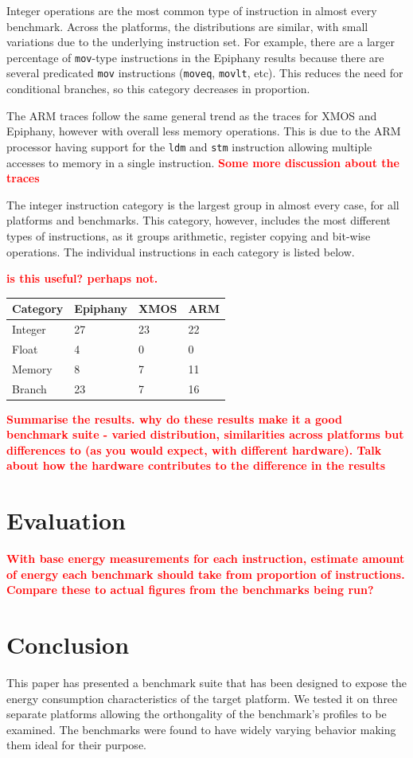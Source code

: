 \documentclass[twocolumn]{article}
\newcommand{\nsection}[1]{\section{\bfseries #1}}
\newcommand{\todo}[1]{\textbf{\textcolor{red}{#1}}}
\begin{document}
Integer operations are the most common type of instruction in almost every benchmark. Across the platforms, the distributions are similar, with small variations due to the underlying instruction set. For example, there are a larger percentage of \texttt{mov}-type instructions in the Epiphany results because there are several predicated \texttt{mov} instructions (\texttt{moveq}, \texttt{movlt}, etc). This reduces the need for conditional branches, so this category decreases in proportion.

The ARM traces follow the same general trend as the traces for XMOS and Epiphany, however with overall less memory operations. This is due to the ARM processor having support for the \texttt{ldm} and \texttt{stm} instruction allowing multiple accesses to memory in a single instruction.
\todo{Some more discussion about the traces}

The integer instruction category is the largest group in almost every case, for all platforms and benchmarks. This category, however, includes the most different types of instructions, as it groups arithmetic, register copying and bit-wise operations. The individual instructions in each category is listed below.

\todo{is this useful? perhaps not.}

\begin{center}
	\begin{tabular}{l l l l}
		Category 	& Epiphany  & XMOS 	& ARM \\
		\hline
		Integer	 	& 27	  	& 23	& 22  \\
		Float		& 4			& 0		& 0	  \\
		Memory		& 8			& 7		& 11  \\
		Branch		& 23		& 7		& 16  \\
	\end{tabular}
\end{center}

\todo{Summarise the results. why do these results make it a good benchmark suite - varied distribution, similarities across platforms but differences to (as you would expect, with different hardware). Talk about how the hardware contributes to the difference in the results}

\nsection{Evaluation}

\todo{With base energy measurements for each instruction, estimate amount of energy each benchmark should take from proportion of instructions. Compare these to actual figures from the benchmarks being run?}

\nsection{Conclusion}

This paper has presented a benchmark suite that has been designed to expose the energy consumption characteristics of the target platform. We tested it on three separate platforms allowing the orthongality of the benchmark's profiles to be examined. The benchmarks were found to have widely varying behavior making them ideal for their purpose. \todo{}

\printbibliography
\end{document}
